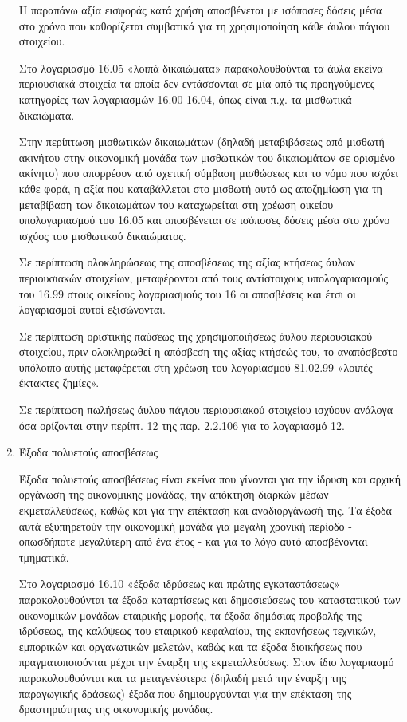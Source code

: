 \documentclass[A4,10pt,greek]{book}
\begin{document}
\begin{enumerate}
Η παραπάνω αξία εισφοράς κατά χρήση αποσβένεται με ισόποσες δόσεις μέσα στο χρόνο που καθορίζεται συμβατικά για τη χρησιμοποίηση κάθε άυλου πάγιου στοιχείου.

Στο λογαριασμό 16.05 «λοιπά δικαιώματα» παρακολουθούνται τα άυλα εκείνα περιουσιακά στοιχεία τα οποία δεν εντάσσονται σε μία από τις προηγούμενες κατηγορίες των λογαριασμών 16.00-16.04, όπως είναι π.χ. τα μισθωτικά δικαιώματα.

Στην περίπτωση μισθωτικών δικαιωμάτων (δηλαδή μεταβιβάσεως από μισθωτή ακινήτου στην οικονομική μονάδα των μισθωτικών του δικαιωμάτων σε ορισμένο ακίνητο) που απορρέουν από σχετική σύμβαση μισθώσεως και το νόμο που ισχύει κάθε φορά, η αξία που καταβάλλεται στο μισθωτή αυτό ως αποζημίωση για τη μεταβίβαση των δικαιωμάτων του καταχωρείται στη χρέωση οικείου υπολογαριασμού του 16.05 και αποσβένεται σε ισόποσες δόσεις μέσα στο χρόνο ισχύος του μισθωτικού δικαιώματος.

Σε περίπτωση ολοκληρώσεως της αποσβέσεως της αξίας κτήσεως άυλων περιουσιακών στοιχείων, μεταφέρονται από τους αντίστοιχους υπολογαριασμούς του 16.99 στους οικείους λογαριασμούς του 16 οι αποσβέσεις και έτσι οι λογαριασμοί αυτοί εξισώνονται.

Σε περίπτωση οριστικής παύσεως της χρησιμοποιήσεως άυλου περιουσιακού στοιχείου, πριν ολοκληρωθεί η απόσβεση της αξίας κτήσεώς του, το αναπόσβεστο υπόλοιπο αυτής μεταφέρεται στη χρέωση του λογαριασμού 81.02.99 «λοιπές έκτακτες ζημίες».

Σε περίπτωση πωλήσεως άυλου πάγιου περιουσιακού στοιχείου ισχύουν ανάλογα όσα ορίζονται στην περίπτ. 12 της παρ. 2.2.106 για το λογαριασμό 12.

\item Έξοδα πολυετούς αποσβέσεως

Έξοδα πολυετούς αποσβέσεως είναι εκείνα που γίνονται για την ίδρυση και αρχική οργάνωση της οικονομικής μονάδας, την απόκτηση διαρκών μέσων εκμεταλλεύσεως, καθώς και για την επέκταση και αναδιοργάνωσή της. Τα έξοδα αυτά εξυπηρετούν την οικονομική μονάδα για μεγάλη χρονική περίοδο - οπωσδήποτε μεγαλύτερη από ένα έτος - και για το λόγο αυτό αποσβένονται τμηματικά.

Στο λογαριασμό 16.10 «έξοδα ιδρύσεως και πρώτης εγκαταστάσεως» παρακολουθούνται τα έξοδα καταρτίσεως και δημοσιεύσεως του καταστατικού των οικονομικών μονάδων εταιρικής μορφής, τα έξοδα δημόσιας προβολής της ιδρύσεως, της καλύψεως του εταιρικού κεφαλαίου, της εκπονήσεως τεχνικών, εμπορικών και οργανωτικών μελετών, καθώς και τα έξοδα διοικήσεως που πραγματοποιούνται μέχρι την έναρξη της εκμεταλλεύσεως. Στον ίδιο λογαριασμό παρακολουθούνται και τα μεταγενέστερα (δηλαδή μετά την έναρξη της παραγωγικής δράσεως) έξοδα που δημιουργούνται για την επέκταση της δραστηριότητας της οικονομικής μονάδας.


\end{enumerate}
\end{document}
